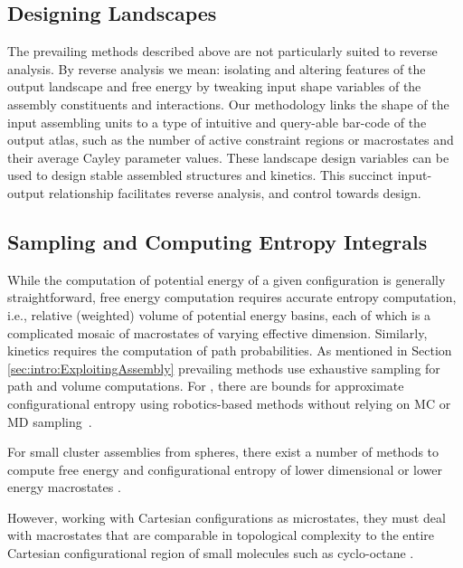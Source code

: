 \documentclass[]{article}
\begin{document}
\subsection{Designing Landscapes} 
\label{sec:intro:designingAssembly} 
The prevailing methods described above are not particularly suited to reverse
analysis. By reverse analysis we mean: isolating and altering features of the
output landscape and free energy by tweaking input shape variables of the
assembly constituents and interactions. Our methodology links the shape of the
input assembling units to a type of intuitive and query-able bar-code of the
output atlas, such as the number of active constraint regions or macrostates
and their average Cayley parameter values. These landscape design variables
can be used to design stable assembled structures and kinetics. This succinct
input-output relationship facilitates reverse analysis, and control towards
design.

\subsection{Sampling and Computing Entropy Integrals} 
\label{sec:intro:VolumeIntegrals}
While the computation of potential energy of a given configuration is generally
straightforward, free energy computation requires accurate entropy computation,
i.e., relative (weighted) volume of potential energy basins, each of which is a
complicated mosaic of macrostates of varying effective dimension. Similarly,
kinetics requires the computation of path probabilities. As mentioned in
Section \ref{sec:intro:ExploitingAssembly} prevailing methods use exhaustive
sampling for path and volume computations. For , there are bounds for
approximate configurational entropy using robotics-based methods without
relying on MC or MD sampling~\cite{GregoryS201199}. 

For small cluster assemblies from spheres, there exist a number of methods to
compute free energy and configurational entropy of lower dimensional or lower
energy macrostates \cite{Holmes-Cerfon2013, Arkus2009, Wales2010,
Beltran-Villegas2011, Calvo2012, Khan2012, Hoy2012, Hoy2014,
Holmes-Cerfon-2018}.

However, working with Cartesian configurations as microstates, they must deal
with macrostates that are comparable in topological complexity to the entire
Cartesian configurational region of small molecules such as cyclo-octane
\cite{Martin2010,Jaillet2017,Porta2007}.
\end{document}

